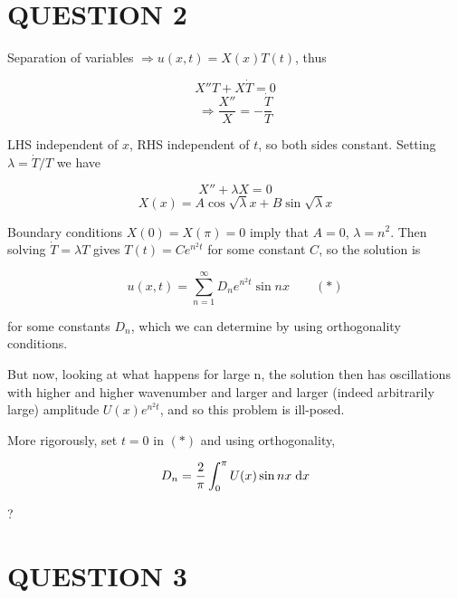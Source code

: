 \documentclass[a4paper]{article}
\begin{document}
\section{QUESTION 2}

Separation of variables $ \Rightarrow u(x,t) = X(x) T(t) $, thus

\[ X''T + X \dot{T} = 0 \]
\[ \Rightarrow \frac{X''}{X} = - \frac{\dot{T}}{T}  \]

LHS independent of $ x $, RHS independent of $ t $, so both sides constant.
Setting $ \lambda = \dot{T} / T $ we have

\[ X'' + \lambda X = 0 \]
\[ X(x) = A \cos \sqrt{\lambda} x + B \sin \sqrt{\lambda} x \]

Boundary conditions $ X(0) = X(\pi) = 0 $ imply that $ A = 0 $, $ \lambda = n^{2} $. Then solving $ \dot{T} = \lambda T $ gives $ T(t) = C e^{n^{2} t} $ for some constant $ C $, so the solution is 

\[ u(x,t) = \sum_{n=1}^{\infty} D_{n} e^{n^{2}t} \sin n x \qquad (*)  \]

for some constants $ D_{n} $, which we can determine by using orthogonality conditions. 

But now, looking at what happens for large n, the solution then has oscillations with higher and higher wavenumber and larger and larger (indeed arbitrarily large) amplitude $ U(x) e^{n^{2}t} $, and so this problem is ill-posed.

More rigorously, set $ t = 0 $ in $ (*) $ and using orthogonality,

\[ D_{n} = \frac{2}{\pi} \int_{0}^{\pi} U(x) \sin n x  \; \mathrm{d} x \]


?

\section{QUESTION 3}
\end{document}
